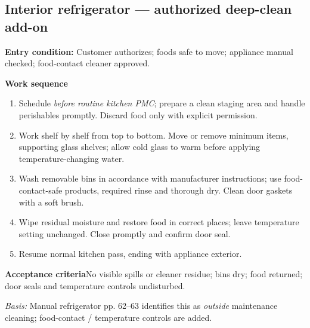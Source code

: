 \documentclass[10pt,letterpaper,oneside]{article}
\newcommand{\subtle}[1]{{\color{graytext}\small #1}}
\newcommand{\sop}[3]{\Needspace{8\baselineskip}\subsection{#1}\subtle{\textbf{Entry condition:} #2}\par\textbf{Work sequence}\begin{enumerate}#3\end{enumerate}}
\newcommand{\accept}[1]{\begin{notebox}\textbf{Acceptance criteria}\quad #1\end{notebox}}
\newcommand{\sources}[1]{\par{\small\color{graytext}\textit{Basis:} #1}\par}
\begin{document}
\sop{Interior refrigerator --- authorized deep-clean add-on}{Customer authorizes; foods safe to move; appliance manual checked; food-contact cleaner approved.}{
\item Schedule \emph{before routine kitchen PMC}; prepare a clean staging area and handle perishables promptly. Discard food only with explicit permission.
\item Work shelf by shelf from top to bottom. Move or remove minimum items, supporting glass shelves; allow cold glass to warm before applying temperature-changing water.
\item Wash removable bins in accordance with manufacturer instructions; use food-contact-safe products, required rinse and thorough dry. Clean door gaskets with a soft brush.
\item Wipe residual moisture and restore food in correct places; leave temperature setting unchanged. Close promptly and confirm door seal.
\item Resume normal kitchen pass, ending with appliance exterior.}
\accept{No visible spills or cleaner residue; bins dry; food returned; door seals and temperature controls undisturbed.}
\sources{Manual refrigerator pp. 62--63 identifies this as \emph{outside} maintenance cleaning; food-contact / temperature controls are added.}
\end{document}

